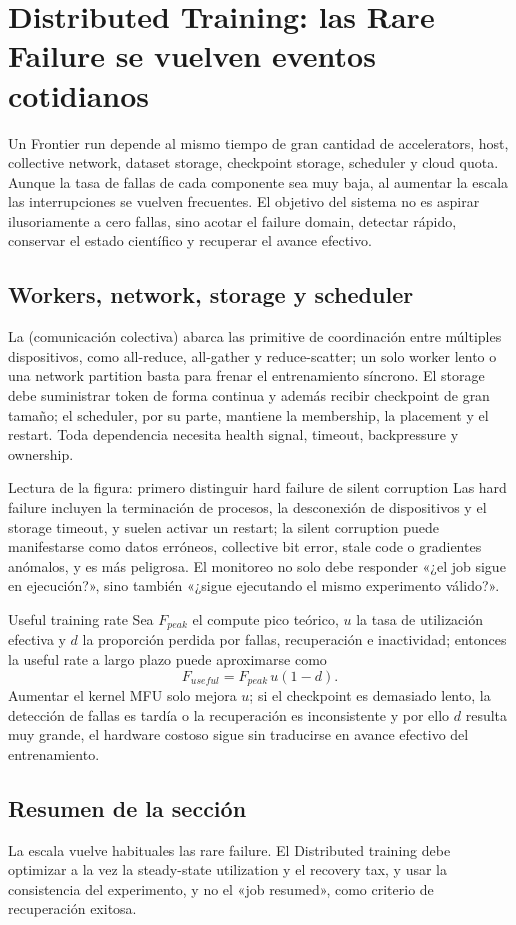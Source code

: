\section{Distributed Training: las Rare Failure se vuelven eventos cotidianos}

Un Frontier run depende al mismo tiempo de gran cantidad de accelerators, host, collective network, dataset storage, checkpoint storage, scheduler y cloud quota. Aunque la tasa de fallas de cada componente sea muy baja, al aumentar la escala las interrupciones se vuelven frecuentes. El objetivo del sistema no es aspirar ilusoriamente a cero fallas, sino acotar el failure domain, detectar rápido, conservar el estado científico y recuperar el avance efectivo.

\subsection{Workers, network, storage y scheduler}

La  (comunicación colectiva) abarca las primitive de coordinación entre múltiples dispositivos, como all-reduce, all-gather y reduce-scatter; un solo worker lento o una network partition basta para frenar el entrenamiento síncrono. El storage debe suministrar token de forma continua y además recibir checkpoint de gran tamaño; el scheduler, por su parte, mantiene la membership, la placement y el restart. Toda dependencia necesita health signal, timeout, backpressure y ownership.


\begin{knowledgebox}{Lectura de la figura: primero distinguir hard failure de silent corruption}
Las hard failure incluyen la terminación de procesos, la desconexión de dispositivos y el storage timeout, y suelen activar un restart; la silent corruption puede manifestarse como datos erróneos, collective bit error, stale code o gradientes anómalos, y es más peligrosa. El monitoreo no solo debe responder «¿el job sigue en ejecución?», sino también «¿sigue ejecutando el mismo experimento válido?».
\end{knowledgebox}

\begin{importantbox}{Useful training rate}
Sea $F_{peak}$ el compute pico teórico, $u$ la tasa de utilización efectiva y $d$ la proporción perdida por fallas, recuperación e inactividad; entonces la useful rate a largo plazo puede aproximarse como
\[
F_{useful}=F_{peak}\,u(1-d).
\]
Aumentar el kernel MFU solo mejora $u$; si el checkpoint es demasiado lento, la detección de fallas es tardía o la recuperación es inconsistente y por ello $d$ resulta muy grande, el hardware costoso sigue sin traducirse en avance efectivo del entrenamiento.
\end{importantbox}

\subsection{Resumen de la sección}

La escala vuelve habituales las rare failure. El Distributed training debe optimizar a la vez la steady-state utilization y el recovery tax, y usar la consistencia del experimento, y no el «job resumed», como criterio de recuperación exitosa.
